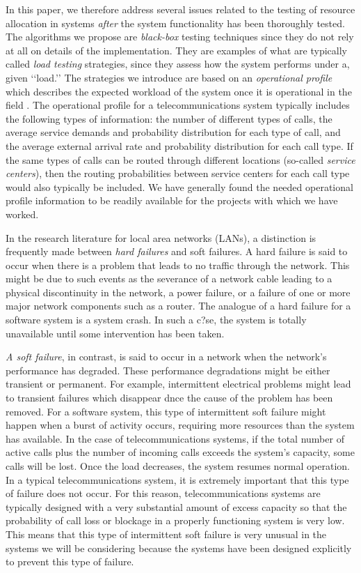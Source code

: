 \documentclass[journal, twoside]{IEEEtran}
\begin{document}
In this paper, we therefore address several issues related to
the testing of resource allocation in systems \textit{after} the system
functionality has been thoroughly tested. The algorithms we
propose are \textit{black-box} testing techniques since they do not rely
at all on details of the implementation. They are examples of
what are typically called \textit{load testing} strategies, since they
assess how the system performs under a, given ‘‘load.’’ The
strategies we introduce are based on an \textit{operational profile}
which describes the expected workload of the system once it is
operational in the field \cite{b7}. The operational profile for a telecommunications system typically includes the following types
of information: the number of different types of calls, the average service demands and probability distribution for each type
of call, and the average external arrival rate and probability
distribution for each call type. If the same types of calls can be routed through different locations (so-called \textit{service centers}),
then the routing probabilities between service centers for each
call type would also typically be included. We have generally
found the needed operational profile information to be readily
available for the projects with which we have worked.

In the research literature for local area networks (LANs), a
distinction is frequently made between \textit{hard failures} and soft
failures. A hard failure is said to occur when there is a problem that leads to no traffic through the network. This might be
due to such events as the severance of a network cable leading
to a physical discontinuity in the network, a power failure, or a
failure of one or more major network components such as a
router. The analogue of a hard failure for a software system is
a system crash. In such a c?se, the system is totally unavailable
until some intervention has been taken.

\textit{A soft failure}, in contrast, is said to occur in a network when
the network’s performance has degraded. These performance
degradations might be either transient or permanent. For example, intermittent electrical problems might lead to transient
failures which disappear dnce the cause of the problem has
been removed. For a software system, this type of intermittent
soft failure might happen when a burst of activity occurs, requiring more resources than the system has available. In the
case of telecommunications systems, if the total number of
active calls plus the number of incoming calls exceeds the
system’s capacity, some calls will be lost. Once the load decreases, the system resumes normal operation. In a typical
telecommunications system, it is extremely important that this
type of failure does not occur. For this reason, telecommunications systems are typically designed with a very substantial
amount of excess capacity so that the probability of call loss or
blockage in a properly functioning system is very low. This
means that this type of intermittent soft failure is very unusual
in the systems we will be considering because the systems
have been designed explicitly to prevent this type of failure.
 
\end{document}
